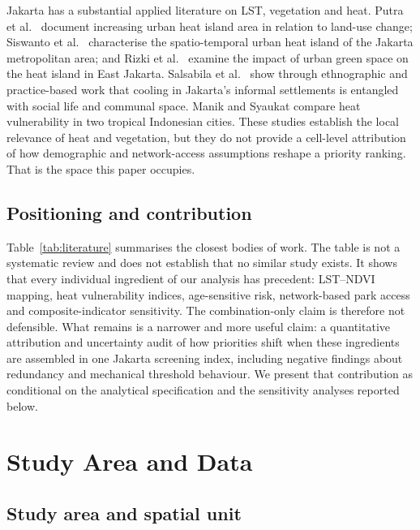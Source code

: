 \documentclass[times,twoside]{_Templates/MultiTargetManuscript}
\begin{document}
Jakarta has a substantial applied literature on LST, vegetation and heat. Putra
et al.\ \citep{putra2021} document increasing urban heat island area in relation
to land-use change; Siswanto et al.\ \citep{siswanto2023} characterise the
spatio-temporal urban heat island of the Jakarta metropolitan area; and Rizki et
al.\ \citep{rizki2024} examine the impact of urban green space on the heat island
in East Jakarta. Salsabila et al.\ \citep{salsabila2023} show through ethnographic
and practice-based work that cooling in Jakarta's informal settlements is
entangled with social life and communal space. Manik and Syaukat
\citep{manik2017} compare heat vulnerability in two tropical Indonesian cities.
These studies establish the local relevance of heat and vegetation, but they do
not provide a cell-level attribution of how demographic and network-access
assumptions reshape a priority ranking. That is the space this paper occupies.

\subsection{Positioning and contribution}

Table~\ref{tab:literature} summarises the closest bodies of work. The table is
not a systematic review and does not establish that no similar study exists. It
shows that every individual ingredient of our analysis has precedent: LST--NDVI
mapping, heat vulnerability indices, age-sensitive risk, network-based park
access and composite-indicator sensitivity. The combination-only claim is
therefore not defensible. What remains is a narrower and more useful claim: a
quantitative attribution and uncertainty audit of how priorities shift when
these ingredients are assembled in one Jakarta screening index, including
negative findings about redundancy and mechanical threshold behaviour. We
present that contribution as conditional on the analytical specification and
the sensitivity analyses reported below.



\section{Study Area and Data}

\subsection{Study area and spatial unit}
\end{document}
